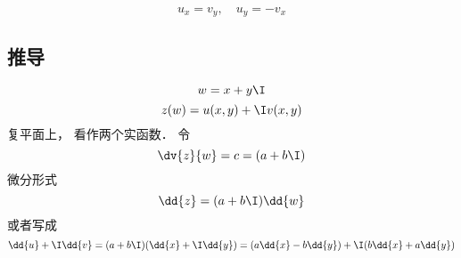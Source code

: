 
\begin{equation}\label{CauRie_eq1}
u_{x}=v_{y}, \quad u_{y}=-v_{x}
\end{equation}


\subsection{推导}
\begin{equation}
w = x + y\I
\end{equation}
\begin{equation}
z(w) = u(x, y) + \I v(x, y)
\end{equation}
复平面上， 看作两个实函数． 令
\begin{equation}
\dv{z}{w} = c = (a + b\I)
\end{equation}
微分形式
\begin{equation}
\dd{z} = (a + b\I)\dd{w}
\end{equation}
或者写成
\begin{equation}
\dd{u} + \I \dd{v} = (a + b\I)(\dd{x} + \I\dd{y}) = (a \dd{x} - b\dd{y}) + \I (b \dd{x} + a\dd{y})
\end{equation}
